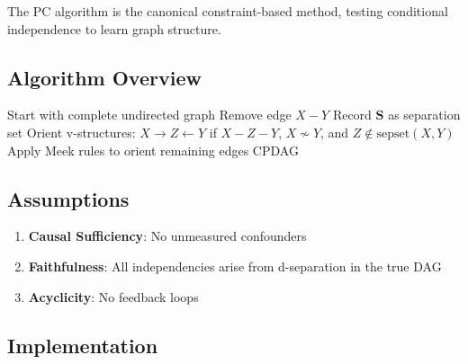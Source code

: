 The PC algorithm \citep{spirtes2000causation} is the canonical constraint-based method, testing conditional independence to learn graph structure.

\subsection{Algorithm Overview}

\begin{algorithm}
\caption{PC Algorithm}
\begin{algorithmic}[1]
\STATE Start with complete undirected graph
\REPEAT
                \STATE Remove edge $X - Y$
                \STATE Record $\mathbf{S}$ as separation set
            \ENDIF
        \ENDFOR
    \ENDFOR
{}
\STATE Orient v-structures: $X \to Z \gets Y$ if $X - Z - Y$, $X \not\sim Y$, and $Z \notin \text{sepset}(X, Y)$
\STATE Apply Meek rules to orient remaining edges
\RETURN CPDAG
\end{algorithmic}
\end{algorithm}

\subsection{Assumptions}

\begin{assumption}
\label{ass:pc}
\begin{enumerate}
    \item \textbf{Causal Sufficiency}: No unmeasured confounders
    \item \textbf{Faithfulness}: All independencies arise from d-separation in the true DAG
    \item \textbf{Acyclicity}: No feedback loops
\end{enumerate}
\end{assumption}

\subsection{Implementation}

